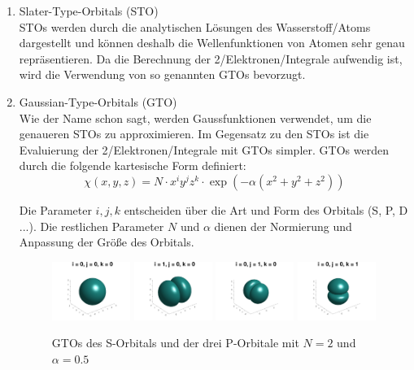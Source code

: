 \begin{enumerate}
    \item Slater-Type-Orbitals (STO)\\
    STOs werden durch die analytischen Lösungen des Wasserstoff\-/Atoms dargestellt
    und können deshalb die Wellenfunktionen von Atomen sehr genau repräsentieren.
    Da die Berechnung der 2\-/Elektronen\-/Integrale aufwendig ist,
    wird die Verwendung von so genannten GTOs bevorzugt.

    \cite[Ab. 5.2]{cramer_2004}
    \cite[S. 2]{tc2_6}

    \item Gaussian-Type-Orbitals (GTO)\\
    Wie der Name schon sagt, werden Gaussfunktionen verwendet,
    um die genaueren STOs zu approximieren. Im Gegensatz zu den STOs ist
    die Evaluierung der 2\-/Elektronen\-/Integrale mit GTOs simpler.
    GTOs werden durch die folgende kartesische Form definiert:\\
    \begin{equation}\label{gto-function}
        \chi(x,y,z) = N \cdot x^i y^j z^k \cdot \exp (-\alpha (x^2+y^2+z^2))
    \end{equation}

    Die Parameter $i,j,k$ entscheiden über die Art und Form des Orbitals (S, P, D ...).
    Die restlichen Parameter $N$ und $\alpha$ dienen der Normierung und Anpassung der Größe des Orbitals.

    \begin{figure}[H]
        \includegraphics[trim=50 0 50 0, clip, width=0.24\textwidth]{res/GTOs/ao_0_0_0.png}
        \includegraphics[trim=50 0 50 0, clip, width=0.24\textwidth]{res/GTOs/ao_1_0_0.png}
        \includegraphics[trim=50 0 50 0, clip, width=0.24\textwidth]{res/GTOs/ao_0_1_0.png}
        \includegraphics[trim=50 0 50 0, clip, width=0.24\textwidth]{res/GTOs/ao_0_0_1.png}
        \caption{GTOs des S-Orbitals und der drei P-Orbitale mit $N=2$ und $\alpha = 0.5$}
    \end{figure}


\end{enumerate}
